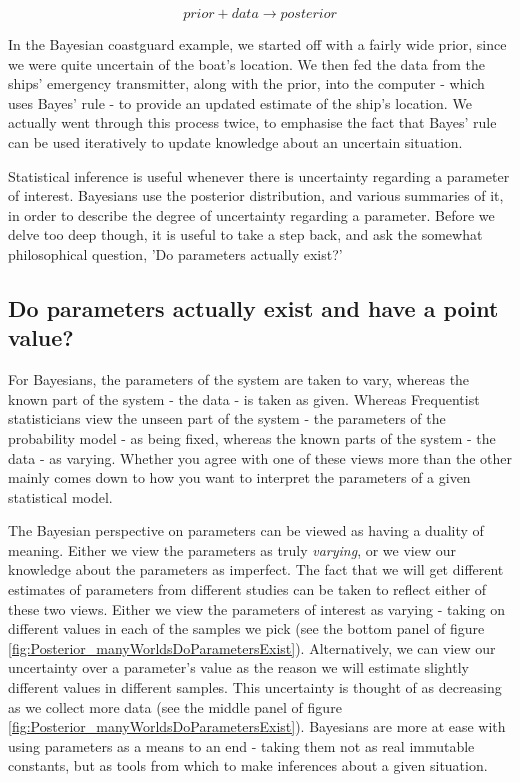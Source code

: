 \documentclass[11pt,fullpage]{book}
\begin{document}
\begin{equation}
prior + data \rightarrow posterior
\end{equation}

In the Bayesian coastguard example, we started off with a fairly wide prior, since we were quite uncertain of the boat's location. We then fed the data from the ships' emergency transmitter, along with the prior, into the computer - which uses Bayes' rule - to provide an updated estimate of the ship's location. We actually went through this process twice, to emphasise the fact that Bayes' rule can be used iteratively to update knowledge about an uncertain situation.

Statistical inference is useful whenever there is uncertainty regarding a parameter of interest. Bayesians use the posterior distribution, and various summaries of it, in order to describe the degree of uncertainty regarding a parameter. Before we delve too deep though, it is useful to take a step back, and ask the somewhat philosophical question, 'Do parameters actually exist?' 

\subsection{Do parameters actually exist and have a point value?}\label{sec:Posterior_parametersExist}
For Bayesians, the parameters of the system are taken to vary, whereas the known part of the system - the data - is taken as given. Whereas Frequentist statisticians view the unseen part of the system - the parameters of the probability model - as being fixed, whereas the known parts of the system - the data - as varying. Whether you agree with one of these views more than the other mainly comes down to how you want to interpret the parameters of a given statistical model. 

The Bayesian perspective on parameters can be viewed as having a duality of meaning. Either we view the parameters as truly \textit{varying}, or we view our knowledge about the parameters as imperfect. The fact that we will get different estimates of parameters from different studies can be taken to reflect either of these two views. Either we view the parameters of interest as varying - taking on different values in each of the samples we pick (see the bottom panel of figure \ref{fig:Posterior_manyWorldsDoParametersExist}). Alternatively, we can view our uncertainty over a parameter's value as the reason we will estimate slightly different values in different samples. This uncertainty is thought of as decreasing as we collect more data (see the middle panel of figure \ref{fig:Posterior_manyWorldsDoParametersExist}). Bayesians are more at ease with using parameters as a means to an end - taking them not as real immutable constants, but as tools from which to make inferences about a given situation.
\end{document}

